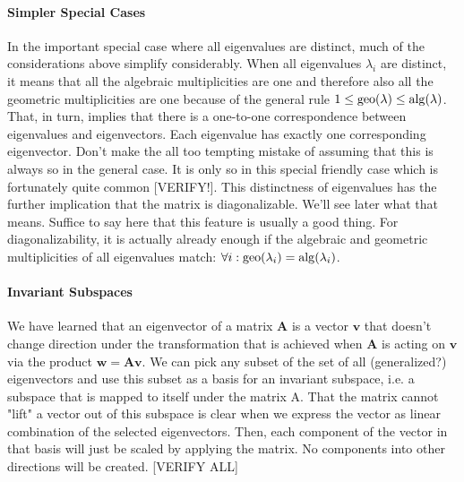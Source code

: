 

\paragraph{Simpler Special Cases} In the important special case where all eigenvalues are distinct, much of the considerations above simplify considerably. When all eigenvalues $\lambda_i$ are distinct, it means that all the algebraic multiplicities are one and therefore also all the geometric multiplicities are one because of the general rule $1 \leq \operatorname{geo}(\lambda) \leq \operatorname{alg}(\lambda)$. That, in turn, implies that there is a one-to-one correspondence between eigenvalues and eigenvectors. Each eigenvalue has exactly one corresponding eigenvector. Don't make the all too tempting mistake of assuming that this is always so in the general case. It is only so in this special friendly case which is fortunately quite common [VERIFY!]. This distinctness of eigenvalues has the further implication that the matrix is diagonalizable. We'll see later what that means. Suffice to say here that this feature is usually a good thing. For diagonalizability, it is actually already enough if the algebraic and geometric multiplicities of all eigenvalues match: $\forall i: \operatorname{geo}(\lambda_i) = \operatorname{alg}(\lambda_i)$. 



\paragraph{Invariant Subspaces}
We have learned that an eigenvector of a matrix $\mathbf{A}$ is a vector $\mathbf{v}$ that doesn't change direction under the transformation that is achieved when $\mathbf{A}$ is acting on  $\mathbf{v}$ via the product $\mathbf{w} = \mathbf{A} \mathbf{v}$. We can pick any subset of the set of all (generalized?) eigenvectors and use this subset as a basis for an invariant subspace, i.e. a subspace that is mapped to itself under the matrix A. That the matrix cannot "lift" a vector out of this subspace is clear when we express the vector as linear combination of the selected eigenvectors. Then, each component of the vector in that basis will just be scaled by applying the matrix. No components into other directions will be created. [VERIFY ALL]

